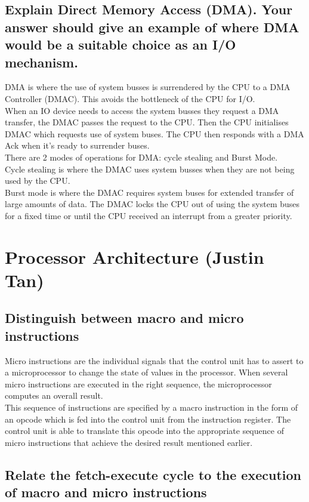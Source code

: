 \documentclass{article}
\begin{document}
\subsection{Explain Direct Memory Access (DMA). Your answer should give an example of where DMA would be a suitable choice as an I/O mechanism.}

DMA is where the use of system busses is surrendered by the CPU to a DMA Controller (DMAC). This avoids the bottleneck of the CPU for I/O.\\
When an IO device needs to access the system busses they request a DMA transfer, the DMAC passes the request to the CPU. Then the CPU initialises DMAC which requests use of system buses. The CPU then responds with a DMA Ack when it's ready to surrender buses.\\
There are 2 modes of operations for DMA: cycle stealing and Burst Mode.\\
Cycle stealing is where the DMAC uses system busses when they are not being used by the CPU.\\
Burst mode is where the DMAC requires system buses for extended transfer of large amounts of data. The DMAC locks the CPU out of using the system buses for a fixed time or until the CPU received an interrupt from a greater priority.
\newpage




\section{Processor Architecture (Justin Tan)}

\subsection{Distinguish between macro and micro instructions}

Micro instructions are the individual signals that the control unit has to assert to a microprocessor to change the state of values in the processor. When several micro instructions are executed in the right sequence, the microprocessor computes an overall result. \\
This sequence of instructions are specified by a macro instruction in the form of an opcode which is fed into the control unit from the instruction register. The control unit is able to translate this opcode into the appropriate sequence of micro instructions that achieve the desired result mentioned earlier.

\subsection{Relate the fetch-execute cycle to the execution of macro and micro instructions}
\end{document}
